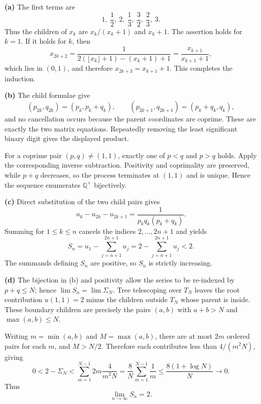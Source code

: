 \begin{solution}
\textbf{(a)} The first terms are
\[
1,\ \frac12,\ 2,\ \frac13,\ \frac32,\ \frac23,\ 3.
\]
Thus the children of $x_k$ are $x_k/(x_k+1)$ and $x_k+1$. The assertion holds for $k=1$. If it holds for $k$, then
\[
x_{2k+2}=\frac1{2(\lfloor x_k\rfloor+1)-(x_k+1)+1}
=\frac{x_{k+1}}{x_{k+1}+1},
\]
which lies in $(0,1)$, and therefore $x_{2k+3}=x_{k+1}+1$. This completes the induction.

\textbf{(b)} The child formulae give
\[
(p_{2k},q_{2k})=(p_k,p_k+q_k),\qquad
(p_{2k+1},q_{2k+1})=(p_k+q_k,q_k),
\]
and no cancellation occurs because the parent coordinates are coprime. These are exactly the two matrix equations. Repeatedly removing the least significant binary digit gives the displayed product.

For a coprime pair $(p,q)\ne(1,1)$, exactly one of $p<q$ and $p>q$ holds. Apply the corresponding inverse subtraction. Positivity and coprimality are preserved, while $p+q$ decreases, so the process terminates at $(1,1)$ and is unique. Hence the sequence enumerates $\mathbb Q^+$ bijectively.

\textbf{(c)} Direct substitution of the two child pairs gives
\[
u_k-u_{2k}-u_{2k+1}=\frac1{p_kq_k(p_k+q_k)}.
\]
Summing for $1\leq k\leq n$ cancels the indices $2,\ldots,2n+1$ and yields
\[
S_n=u_1-\sum_{j=n+1}^{2n+1}u_j=2-\sum_{j=n+1}^{2n+1}u_j<2.
\]
The summands defining $S_n$ are positive, so $S_n$ is strictly increasing.

\textbf{(d)} The bijection in (b) and positivity allow the series to be re-indexed by $p+q\leq N$; hence $\lim S_n=\lim\Sigma_N$. Tree telescoping over $T_N$ leaves the root contribution $u(1,1)=2$ minus the children outside $T_N$ whose parent is inside. These boundary children are precisely the pairs $(a,b)$ with $a+b>N$ and $\max(a,b)\leq N$.

Writing $m=\min(a,b)$ and $M=\max(a,b)$, there are at most $2m$ ordered pairs for each $m$, and $M>N/2$. Therefore each contributes less than $4/(m^2N)$, giving
\[
0<2-\Sigma_N<\sum_{m=1}^{N-1}2m\frac4{m^2N}
=\frac8N\sum_{m=1}^{N-1}\frac1m\leq\frac{8(1+\log N)}N\longrightarrow0.
\]
Thus
\[
\boxed{\displaystyle\lim_{n\to\infty}S_n=2}.
\]
\end{solution}

